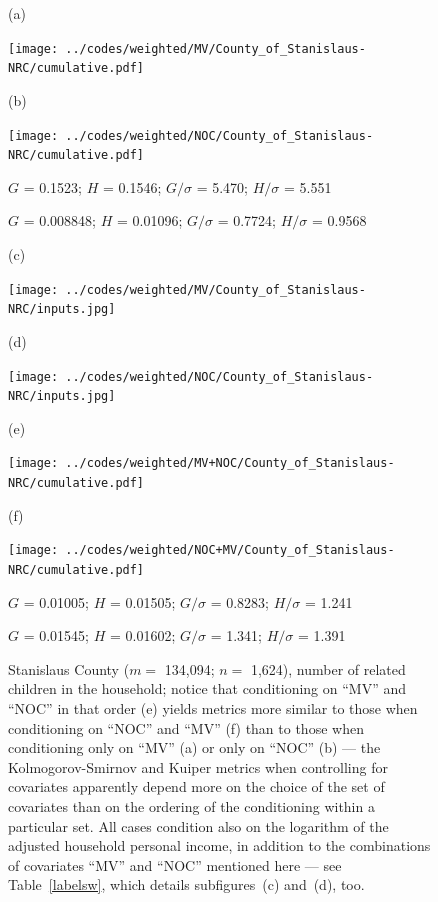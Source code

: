 \documentclass{article}
\newlength{\vertsep}
\newlength{\imsize}
\newlength{\imsized}
\begin{document}
\begin{figure}
\begin{centering}

(a) \parbox{\imsize}{\texttt{[image: ../codes/weighted/MV/County\_of\_Stanislaus-NRC/cumulative.pdf]}}
\quad\quad
(b) \parbox{\imsize}{\texttt{[image: ../codes/weighted/NOC/County\_of\_Stanislaus-NRC/cumulative.pdf]}}

\parbox{\imsized}{\hfil \footnotesize $G$ = 0.1523; $H$ = 0.1546;
$G/\sigma$ = 5.470; $H/\sigma$ = 5.551}
\parbox{\imsized}{\hfil \footnotesize $G$ = 0.008848; $H$ = 0.01096;
$G/\sigma$ = 0.7724; $H/\sigma$ = 0.9568}

\vspace{\vertsep}

(c) \parbox{\imsize}{\texttt{[image: ../codes/weighted/MV/County\_of\_Stanislaus-NRC/inputs.jpg]}}
\quad\quad
(d) \parbox{\imsize}{\texttt{[image: ../codes/weighted/NOC/County\_of\_Stanislaus-NRC/inputs.jpg]}}

\vspace{\vertsep}

(e) \parbox{\imsize}{\texttt{[image: ../codes/weighted/MV+NOC/County\_of\_Stanislaus-NRC/cumulative.pdf]}}
\quad\quad
(f) \parbox{\imsize}{\texttt{[image: ../codes/weighted/NOC+MV/County\_of\_Stanislaus-NRC/cumulative.pdf]}}

\parbox{\imsized}{\hfil \footnotesize $G$ = 0.01005; $H$ = 0.01505;
$G/\sigma$ = 0.8283; $H/\sigma$ = 1.241}
\parbox{\imsized}{\hfil \footnotesize $G$ = 0.01545; $H$ = 0.01602;
$G/\sigma$ = 1.341; $H/\sigma$ = 1.391}

\end{centering}
\caption{Stanislaus County ($m =$ 134,094; $n =$ 1,624),
number of related children in the household;
notice that conditioning on ``MV'' and ``NOC'' in that order (e) yields
metrics more similar to those when conditioning on ``NOC'' and ``MV'' (f)
than to those when conditioning only on ``MV'' (a) or only on ``NOC'' (b) ---
the Kolmogorov-Smirnov and Kuiper metrics when controlling
for covariates apparently depend more on the choice
of the set of covariates than on the ordering of the conditioning
within a particular set. All cases condition also on the logarithm
of the adjusted household personal income, in addition to the combinations
of covariates ``MV'' and ``NOC'' mentioned here --- see Table~\ref{labelsw},
which details subfigures~(c) and~(d), too.}
\label{stanislaus}
\end{figure}
\end{document}
